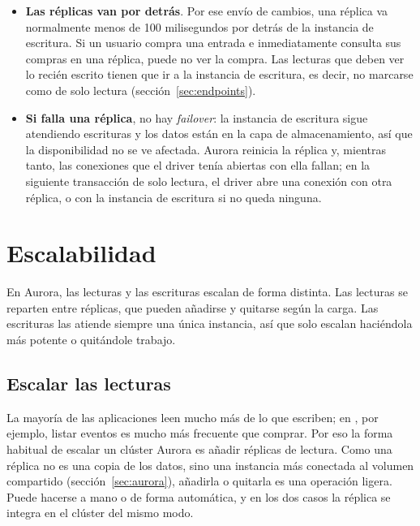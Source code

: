 \documentclass[12pt,a4paper]{article}
\begin{document}
\begin{itemize}
    \item \textbf{Las réplicas van por detrás}. Por ese envío de cambios, una réplica va normalmente menos de 100 milisegundos por detrás de la instancia de escritura. Si un usuario compra una entrada e inmediatamente consulta sus compras en una réplica, puede no ver la compra. Las lecturas que deben ver lo recién escrito tienen que ir a la instancia de escritura, es decir, no marcarse como de solo lectura (sección~\ref{sec:endpoints}).
    \item \textbf{Si falla una réplica}, no hay \textit{failover}: la instancia de escritura sigue atendiendo escrituras y los datos están en la capa de almacenamiento, así que la disponibilidad no se ve afectada. Aurora reinicia la réplica y, mientras tanto, las conexiones que el driver tenía abiertas con ella fallan; en la siguiente transacción de solo lectura, el driver abre una conexión con otra réplica, o con la instancia de escritura si no queda ninguna.
\end{itemize}

\section{Escalabilidad}\label{sec:escalabilidad}

En Aurora, las lecturas y las escrituras escalan de forma distinta. Las lecturas se reparten entre réplicas, que pueden añadirse y quitarse según la carga. Las escrituras las atiende siempre una única instancia, así que solo escalan haciéndola más potente o quitándole trabajo.

\subsection{Escalar las lecturas}

La mayoría de las aplicaciones leen mucho más de lo que escriben; en \proyecto, por ejemplo, listar eventos es mucho más frecuente que comprar. Por eso la forma habitual de escalar un clúster Aurora es añadir réplicas de lectura. Como una réplica no es una copia de los datos, sino una instancia más conectada al volumen compartido (sección~\ref{sec:aurora}), añadirla o quitarla es una operación ligera. Puede hacerse a mano o de forma automática, y en los dos casos la réplica se integra en el clúster del mismo modo.
\end{document}
